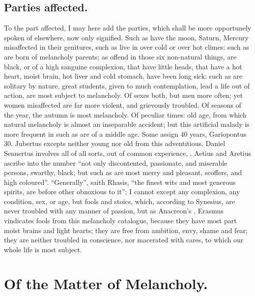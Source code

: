 \subsection{Parties affected.}
To the part affected, I may here add the parties, which shall be more
opportunely spoken of elsewhere, now only signified. Such as have the moon,
Saturn, Mercury misaffected in their genitures, such as live in over cold or
over hot climes: such as are born of melancholy parents; as offend in those six
non-natural things, are black, or of a high sanguine complexion,
that have little heads, that have a hot heart, moist
brain, hot liver and cold stomach, have been long sick: such as are solitary by
nature, great students, given to much contemplation, lead a life out of action,
are most subject to melancholy. Of sexes both, but men more often; yet
women misaffected are far more violent, and grievously
troubled. Of seasons of the year, the autumn is most melancholy. Of peculiar
times: old age, from which natural melancholy is almost an inseparable
accident; but this artificial malady is more frequent in such as are of a
middle age. Some assign 40 years, Gariopontus 30. Jubertus
excepts neither young nor old from this adventitious. Daniel Sennertus involves
all of all sorts, out of common experience, . Aetius and Aretius
ascribe into the number \enquote{not only
discontented, passionate, and miserable persons, swarthy,
black; but such as are most merry and pleasant, scoffers, and high coloured}.
\enquote{Generally}, saith Rhasis, \enquote{the finest wits and most
generous spirits, are before other obnoxious to it}; I cannot except any
complexion, any condition, sex, or age, but fools and
stoics, which, according to Synesius, are never troubled
with any manner of passion, but as Anacreon's . Erasmus vindicates fools from this melancholy
catalogue, because they have most part moist brains and light hearts;
they are free from ambition, envy, shame and fear; they
are neither troubled in conscience, nor macerated with cares, to which our
whole life is most subject.

\section{Of the Matter of Melancholy.}\label{sec:matter-of-melancholy}

